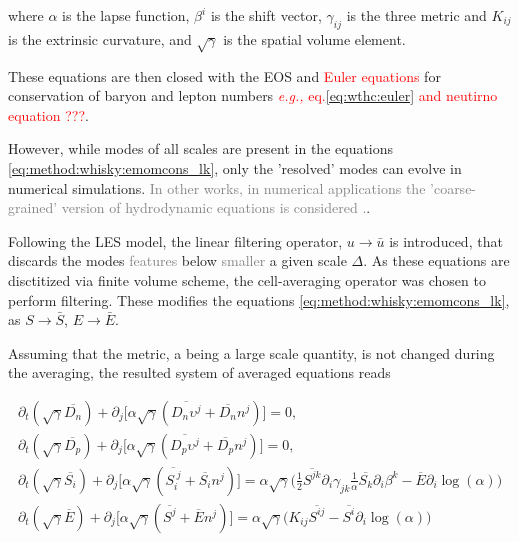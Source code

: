 \documentclass[11pt,a4paper,headinclude=true,DIV=14,BCOR=8mm,chapterprefix,listof=totoc,twoside,openright,abstracton]{scrbook}
\newcommand{\red}[1]{\textcolor{red}{#1}}
\newcommand{\gray}[1]{\textcolor{gray}{#1}}
\begin{document}
where $\alpha$ is the lapse function, $\beta^i$ is the shift vector, $\gamma_{ij}$ is the three metric and $K_{ij}$ is the extrinsic curvature, and $\sqrt{\gamma}$ is the spatial volume element.

These equations are then closed with the EOS and \red{Euler equations} for conservation of baryon and 
lepton numbers \red{\textit{e.g.,} eq.\eqref{eq:wthc:euler} and neutirno equation ???}.

However, while modes of all scales are present in the equations \eqref{eq:method:whisky:emomcons_lk}, 
only the 'resolved' modes can evolve in numerical simulations. 
\gray{In other works, in numerical applications the 'coarse-grained' version of hydrodynamic equations
    is considered \cite{Radice:2017zta}.}.

Following the LES model, the linear filtering operator, $u\rightarrow \bar{u}$ is introduced, that 
discards the modes \gray{features} below \gray{smaller} a given scale $\Delta$.
As these equations are disctitized via finite volume scheme, the cell-averaging operator was chosen to
perform filtering. These modifies the equations \eqref{eq:method:whisky:emomcons_lk}, as
$S\rightarrow\bar{S}$, $E\rightarrow\bar{E}$.

Assuming that the metric, a being a large scale quantity, is not changed during the averaging, the resulted system of averaged equations reads \cite{Radice:2017zta}

\begin{eqnarray}
\label{eq:method:whisky:emomcons_lk_filt}
\partial_t(\sqrt{\gamma}\overline{D_n}) + \partial_j\Big[ \alpha\sqrt{\gamma}(\overline{D_n\upsilon^j} + \overline{D_n}n^j) \Big] = 0, \\
\partial_t(\sqrt{\gamma}\overline{D_p}) + \partial_j\Big[ \alpha\sqrt{\gamma}(\overline{D_p\upsilon^j} + \overline{D_p}n^j) \Big] = 0, \\
\partial_t(\sqrt{\gamma}\overline{S_i}) + \partial_j\Big[ \alpha \sqrt{\gamma} (\overline{S_i^{\; j}} + \overline{S_i} n^j) \Big] = 
\alpha \sqrt{\gamma}\Big( \frac{1}{2} \overline{S^{jk}} \partial_i \gamma_{jk} \frac{1}{\alpha} \overline{S_k} \partial_i \beta^k - \overline{E}\partial_i \log(\alpha) \Big) \\
\partial_t(\sqrt{\gamma}\overline{E}) + \partial_j\Big[ \alpha \sqrt{\gamma} (\overline{S^{j}} + \overline{E} n^j) \Big] = 
\alpha \sqrt{\gamma}\Big( K_{ij}\overline{S^{ij}} - \overline{S^i}\partial_i \log(\alpha) \Big) 
\end{eqnarray}
\end{document}
